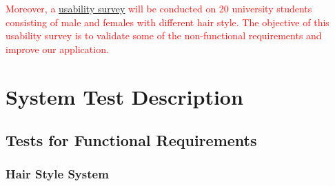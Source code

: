 \documentclass[12pt, titlepage]{article}
\begin{document}
\noindent \textcolor{red}{Moreover, a \hyperref[sec:survey]{usability survey} will be conducted on 20 university students consisting of male and females with different hair style. The objective of this usability survey is to validate some of the non-functional requirements and improve our application.}


\section{System Test Description}
	
\subsection{Tests for Functional Requirements}

\subsubsection{Hair Style System}
		
\end{document}
